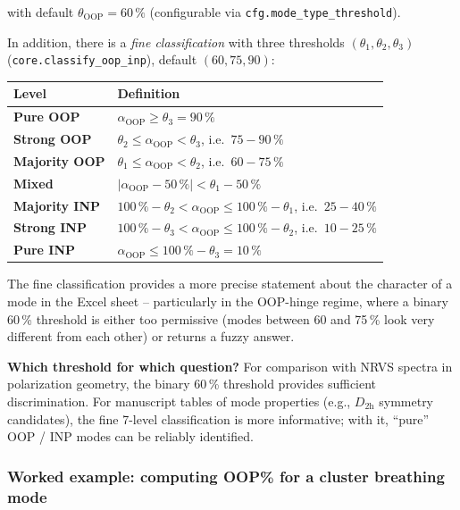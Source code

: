 \documentclass[11pt,a4paper,twoside]{article}
\newcommand{\OOP}{\mathrm{OOP}}
\theoremstyle{remark}
\begin{document}
with default $\theta_{\text{OOP}} = 60\,\%$ (configurable via
\texttt{cfg.mode\_type\_threshold}).

In addition, there is a \emph{fine classification} with three
thresholds $(\theta_1, \theta_2, \theta_3)$
(\texttt{core.classify\_oop\_inp}), default $(60, 75, 90)$:

\begin{center}
\begin{tabularx}{\textwidth}{l X}
\toprule
\textbf{Level} & \textbf{Definition} \\
\midrule
\textbf{Pure OOP}        & $\alpha_{\OOP} \geq \theta_3 = 90\,\%$ \\
\textbf{Strong OOP}      & $\theta_2 \leq \alpha_{\OOP} < \theta_3$, i.e.\ $75-90\,\%$ \\
\textbf{Majority OOP}    & $\theta_1 \leq \alpha_{\OOP} < \theta_2$, i.e.\ $60-75\,\%$ \\
\textbf{Mixed}           & $|{\alpha_{\OOP} - 50\,\%}| < \theta_1 - 50\,\%$ \\
\textbf{Majority INP}    & $100\,\% - \theta_2 < \alpha_{\OOP} \leq 100\,\% - \theta_1$, i.e.\ $25-40\,\%$ \\
\textbf{Strong INP}      & $100\,\% - \theta_3 < \alpha_{\OOP} \leq 100\,\% - \theta_2$, i.e.\ $10-25\,\%$ \\
\textbf{Pure INP}        & $\alpha_{\OOP} \leq 100\,\% - \theta_3 = 10\,\%$ \\
\bottomrule
\end{tabularx}
\end{center}

The fine classification provides a more precise statement about the
character of a mode in the Excel sheet -- particularly in the
OOP-hinge regime, where a binary 60\,\% threshold is either too
permissive (modes between 60 and 75\,\% look very different from
each other) or returns a fuzzy answer.

\begin{infobox}
\textbf{Which threshold for which question?} For comparison with
NRVS spectra in polarization geometry, the binary 60\,\% threshold
provides sufficient discrimination. For manuscript tables of
mode properties (e.g., $D_\mathrm{2h}$ symmetry candidates), the
fine 7-level classification is more informative; with it, ``pure''
OOP / INP modes can be reliably identified.
\end{infobox}

\subsubsection*{Worked example: computing OOP\% for a cluster breathing mode}
\end{document}
